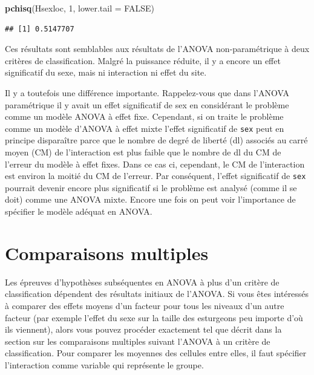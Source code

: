 \documentclass[12pt,]{book}
\newenvironment{Shaded}{\begin{snugshade}}{\end{snugshade}}
\newcommand{\DataTypeTok}[1]{\textcolor[rgb]{0.13,0.29,0.53}{#1}}
\newcommand{\DecValTok}[1]{\textcolor[rgb]{0.00,0.00,0.81}{#1}}
\newcommand{\KeywordTok}[1]{\textcolor[rgb]{0.13,0.29,0.53}{\textbf{#1}}}
\newcommand{\NormalTok}[1]{#1}
\newcommand{\OtherTok}[1]{\textcolor[rgb]{0.56,0.35,0.01}{#1}}
\begin{document}
\begin{Shaded}
\begin{Highlighting}[]
\KeywordTok{pchisq}\NormalTok{(Hsexloc, }\DecValTok{1}\NormalTok{, }\DataTypeTok{lower.tail =} \OtherTok{FALSE}\NormalTok{)}
\end{Highlighting}
\end{Shaded}

\begin{verbatim}
## [1] 0.5147707
\end{verbatim}

Ces résultats sont semblables aux résultats de l'ANOVA non-paramétrique à deux critères de classification. Malgré la puissance réduite, il y a encore un effet significatif du sexe, mais ni interaction ni effet du site.

Il y a toutefois une différence importante. Rappelez-vous que dans l'ANOVA paramétrique il y avait un effet significatif de sex en considérant le problème comme un modèle ANOVA à effet fixe. Cependant, si on traite le problème comme un modèle d'ANOVA à effet mixte l'effet significatif de \texttt{sex} peut en principe disparaître parce que le nombre de degré de liberté (dl) associés au carré moyen (CM) de l'interaction est plus faible que le nombre de dl du CM de l'erreur du modèle à effet fixes. Dans ce cas ci, cependant, le CM de l'interaction est environ la moitié du CM de l'erreur. Par conséquent, l'effet significatif de \texttt{sex} pourrait devenir encore plus significatif si le problème est analysé (comme il se doit) comme une ANOVA mixte. Encore une fois on peut voir l'importance de spécifier le modèle adéquat en ANOVA.

\hypertarget{comparaisons-multiples}{%
\section{Comparaisons multiples}\label{comparaisons-multiples}}

Les épreuves d'hypothèses subséquentes en ANOVA à plus d'un critère de classification dépendent des résultats initiaux de l'ANOVA. Si vous êtes intéressés à comparer des effets moyens d'un facteur pour tous les niveaux d'un autre facteur (par exemple l'effet du sexe sur la taille des esturgeons peu importe d'où ils viennent), alors vous pouvez procéder exactement tel que décrit dans la section sur les comparaisons multiples suivant l'ANOVA à un critère de classification. Pour comparer les moyennes des cellules entre elles, il faut spécifier l'interaction comme variable qui représente le groupe.
\end{document}
